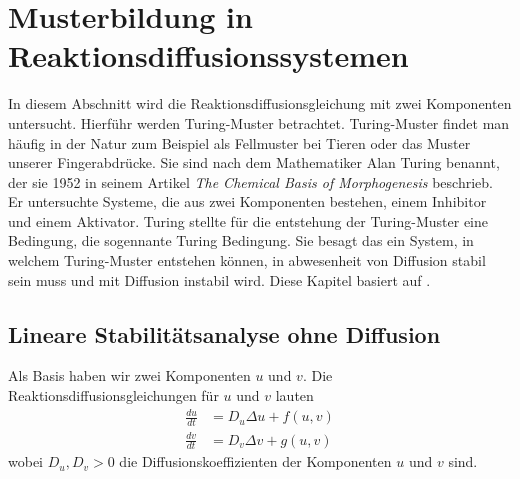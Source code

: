 %
%
%
%
\section{Musterbildung in Reaktionsdiffusionssystemen
\label{reaktdiff:section:teil1}}
In diesem Abschnitt wird die Reaktionsdiffusionsgleichung mit zwei Komponenten
untersucht.
Hierführ werden Turing-Muster betrachtet.
Turing-Muster findet man häufig in der Natur zum Beispiel als Fellmuster bei Tieren oder  das Muster unserer Fingerabdrücke.
Sie sind nach dem Mathematiker Alan Turing benannt, der sie 1952 in seinem Artikel \textit{The Chemical Basis of Morphogenesis} beschrieb.
Er untersuchte Systeme, die aus zwei Komponenten bestehen, einem Inhibitor und einem Aktivator.
Turing stellte für die entstehung der Turing-Muster eine Bedingung, die sogennante Turing Bedingung.
Sie besagt das ein System, in welchem Turing-Muster entstehen können, in abwesenheit von Diffusion stabil sein muss und mit Diffusion instabil wird.
Diese Kapitel basiert auf \cite{reaktdiff:turing_patterns_2019} \cite{reaktdiff:hoyle2006pattern}.

\subsection{Lineare Stabilitätsanalyse ohne Diffusion
\label{reaktdiff:subsection:mathe}}
Als Basis haben wir zwei Komponenten \(u\) und \(v\).
Die Reaktionsdiffusionsgleichungen für \(u\) und \(v\) lauten
\begin{align}
    \label{reaktdiff:equation:reaktdiff2}
    \frac{du}{dt} &= D_u \Delta u + f(u,v)\\
    \frac{dv}{dt} &= D_v \Delta v + g(u,v)
\end{align}
wobei \(D_u, D_v > 0\) die Diffusionskoeffizienten der Komponenten \(u\) und \(v\) sind.

